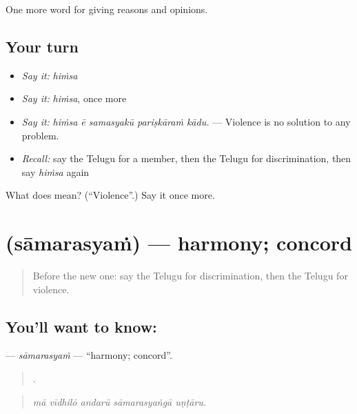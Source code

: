 \begin{grammarlens}[title={What you've built}]
One more word for giving reasons and opinions.
\end{grammarlens}

\subsection*{Your turn}
\begin{itemize}
\raggedright
  \item \emph{Say it:} \emph{hiṁsa}
  \item \emph{Say it:} \emph{hiṁsa}, once more
  \item \emph{Say it:} \emph{hiṁsa ē samasyakū pariṣkāraṁ kādu.} — Violence is no solution to any problem.
  \item \emph{Recall:} say the Telugu for a member, then the Telugu for discrimination, then say \emph{hiṁsa} again
\end{itemize}

\begin{tcolorbox}[breakable,colback=teal!4,colframe=teal!35!black,title={Before you move on}]
What does  mean? (\textquotedblleft{}Violence\textquotedblright{}.) Say it once more.
\end{tcolorbox}
\section[\texorpdfstring{\te{సామరస్యం} (sāmarasyaṁ)}{సామరస్యం (sāmarasyaṁ)}]{ (sāmarasyaṁ) — harmony; concord}

\label{lesson:TE-C409-samarasyam}



\begin{quote}
Before the new one: say the Telugu for discrimination, then the Telugu for violence.
\end{quote}

\subsection*{You'll want to know: }
\textbf{} — \emph{sāmarasyaṁ} — \textquotedblleft{}harmony; concord\textquotedblright{}.

\begin{quote}
    .
\end{quote}

\begin{quote}
\emph{mā vīdhilō andarū sāmarasyaṅgā uṇṭāru.}
\end{quote}

